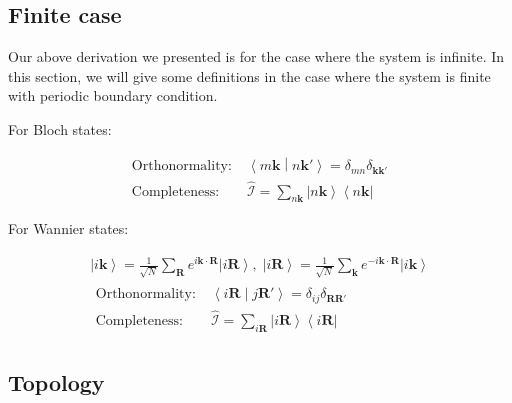 \subsection{Finite case}

Our above derivation we presented is for the case where the system is infinite.
In this section, we will give some definitions in the case where the system is finite with periodic boundary condition.

\noindent
For Bloch states:

\begin{equation}
  \begin{aligned}
    \text{Orthonormality:} \;&
    \left\langle m\boldsymbol{k} \middle| n\boldsymbol{k}' \right\rangle 
      = \delta_{mn} \delta_{\boldsymbol{k}\boldsymbol{k}'} \\
    \text{Completeness:} \;&
    \hat{\mathcal{I}} = \sum_{n\boldsymbol{k}} \left| n\boldsymbol{k} \right\rangle \left\langle n\boldsymbol{k} \right| 
  \end{aligned}
\end{equation}

\noindent
For Wannier states:

\begin{equation}
  \begin{gathered}
    \left| i\boldsymbol{k} \right\rangle 
      = \frac{1}{\sqrt{N}} \sum_{\boldsymbol{R}} e^{i\boldsymbol{k} \cdot \boldsymbol{R}} \left| i\boldsymbol{R} \right\rangle ,\;
    \left| i\boldsymbol{R} \right\rangle 
      = \frac{1}{\sqrt{N}} \sum_{\boldsymbol{k}} e^{-i\boldsymbol{k} \cdot \boldsymbol{R}} 
        \left| i\boldsymbol{k} \right\rangle \\
    \begin{aligned}
      \text{Orthonormality:} \;&
        \left\langle i\boldsymbol{R} \middle| j\boldsymbol{R}' \right\rangle = \delta_{ij} \delta_{\boldsymbol{R}\boldsymbol{R}'} \\
      \text{Completeness:} \;&
        \hat{\mathcal{I}} = \sum_{i\boldsymbol{R}} \left| i\boldsymbol{R} \right\rangle \left\langle i\boldsymbol{R} \right| 
    \end{aligned}
  \end{gathered}
\end{equation}

\subsection{Topology}